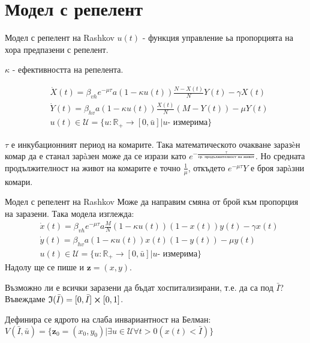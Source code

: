 \section{Модел с репелент}
\begin{frame}[t]{Модел с репелент на Rashkov}
  $u(t)$ - функция управление ьа пропорцията на хора предпазени с репелент.

  $\kappa$ - ефективността на репелента.

  \begin{equation}
    \label{eq:RepelentProblem}
    \begin{split}
      &\dot{X}(t) = \beta_{vh} e^{-\mu \tau} a (1-\kappa u(t)) \frac{N-X(t)}{N} Y(t) - \gamma X(t) \\
      &\dot{Y}(t) = \beta_{hv} a (1-\kappa u(t)) \frac{X(t)}{N} (M-Y(t)) - \mu Y(t) \\
      &u(t) \in \mathscr{U} = \{u:\mathbb{R}_+ \rightarrow [0, \bar{u}] \vert u \text{- измерима}\}
    \end{split}
  \end{equation}

  $\tau$ е инкубационният период на комарите. Така математическото очакване заразèн комар да е станал зарàзен може да се изрази като $e^{-\frac{\tau}{\text{ср. продължителност на живот}}}$. Но средната продължителност на живот на комарите е точно $\frac{1}{\mu}$, откъдето $e^{-\mu\tau}Y$ е броя зарàзни комари.
\end{frame}

\begin{frame}[t]{Модел с репелент на Rashkov}
  Може да направим смяна от брой към пропорция на заразени. Така модела изглежда:
  \begin{equation}
    \begin{split}
      &\dot{x}(t) = \beta_{vh} e^{-\mu \tau} a \frac{M}{N} (1-\kappa u(t)) (1 - x(t)) y(t) - \gamma x(t) \\
      &\dot{y}(t) = \beta_{hv} a (1-\kappa u(t)) x(t) (1 - y(t)) - \mu y(t) \\
      &u(t) \in \mathscr{U} = \{u:\mathbb{R}_+ \rightarrow [0, \bar{u}] \vert u \text{- измерима}\}
    \end{split}
  \end{equation}
  Надолу ще се пише и $\boldsymbol{z}=(x,y)$.

  Възможно ли е всички заразени да бъдат хоспитализирани, т.е. да са под $\bar{I}$?
  Въвеждаме $\mathfrak{I}(\bar{I}) = [0, \bar{I}] \cross [0, 1]$.

  Дефинира се ядрото на слаба инвариантност на Белман:
  $V(\bar{I}, \bar{u}) = \{\boldsymbol{z}_0=(x_0, y_0) \vert \exists{u \in \mathscr{U}}\forall t>0 \left(x(t) < \bar{I}\right)\}$
\end{frame}

